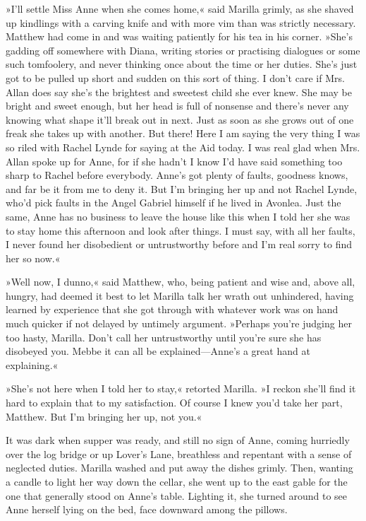 »I’ll settle Miss Anne when she comes home,« said Marilla grimly, as she shaved up kindlings with a carving knife and with more vim than was strictly necessary. Matthew had come in and was waiting patiently for his tea in his corner. »She’s gadding off somewhere with Diana, writing stories or practising dialogues or some such tomfoolery, and never thinking once about the time or her duties. She’s just got to be pulled up short and sudden on this sort of thing. I don’t care if Mrs. Allan does say she’s the brightest and sweetest child she ever knew. She may be bright and sweet enough, but her head is full of nonsense and there’s never any knowing what shape it’ll break out in next. Just as soon as she grows out of one freak she takes up with another. But there! Here I am saying the very thing I was so riled with Rachel Lynde for saying at the Aid today. I was real glad when Mrs. Allan spoke up for Anne, for if she hadn’t I know I’d have said something too sharp to Rachel before everybody. Anne’s got plenty of faults, goodness knows, and far be it from me to deny it. But I’m bringing her up and not Rachel Lynde, who’d pick faults in the Angel Gabriel himself if he lived in Avonlea. Just the same, Anne has no business to leave the house like this when I told her she was to stay home this afternoon and look after things. I must say, with all her faults, I never found her disobedient or untrustworthy before and I’m real sorry to find her so now.«

»Well now, I dunno,« said Matthew, who, being patient and wise and, above all, hungry, had deemed it best to let Marilla talk her wrath out unhindered, having learned by experience that she got through with whatever work was on hand much quicker if not delayed by untimely argument. »Perhaps you’re judging her too hasty, Marilla. Don’t call her untrustworthy until you’re sure she has disobeyed you. Mebbe it can all be explained—Anne’s a great hand at explaining.«

»She’s not here when I told her to stay,« retorted Marilla. »I reckon she’ll find it hard to explain that to my satisfaction. Of course I knew you’d take her part, Matthew. But I’m bringing her up, not you.«

It was dark when supper was ready, and still no sign of Anne, coming hurriedly over the log bridge or up Lover’s Lane, breathless and repentant with a sense of neglected duties. Marilla washed and put away the dishes grimly. Then, wanting a candle to light her way down the cellar, she went up to the east gable for the one that generally stood on Anne’s table. Lighting it, she turned around to see Anne herself lying on the bed, face downward among the pillows.

